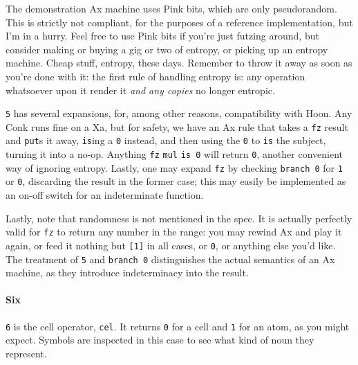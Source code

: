 \documentclass[twoside]{article}
\begin{document}
The demonstration Ax machine uses Pink bits, which are only pseudorandom. This is strictly not compliant, for the purposes of a reference implementation, but I'm in a hurry. Feel free to use Pink bits if you're just futzing around, but consider making or buying a gig or two of entropy, or picking up an entropy machine. Cheap stuff, entropy, these days. Remember to throw it away as soon as you're done with it: the first rule of handling entropy is: any operation whatsoever upon it render it \emph{and any copies} no longer entropic.



\texttt{5} has several expansions, for, among other reasons, compatibility with Hoon. Any Conk runs fine on a Xa, but for safety, we have an Ax rule that takes a \texttt{fz} result and \texttt{put}s it away, \texttt{is}ing a \texttt{0} instead, and then using the \texttt{0} to \texttt{is} the subject, turning it into a no-op. Anything \texttt{fz} \texttt{mul} \texttt{is 0} will return \texttt{0}, another convenient way of ignoring entropy. Lastly, one may expand \texttt{fz} by checking \texttt{branch 0} for \texttt{1} or \texttt{0}, discarding the result in the former case; this may easily be implemented as an on-off switch for an indeterminate function.

Lastly, note that randomness is not mentioned in the spec. It is actually perfectly valid for \texttt{fz} to return any number in the range: you may rewind Ax and play it again, or feed it nothing but \texttt{[1]} in all cases, or \texttt{0}, or anything else you'd like. The treatment of \texttt{5} and \texttt{branch 0} distinguishes the actual semantics of an Ax machine, as they introduce indeterminacy into the result. 


\paragraph{Six}

\texttt{6} is the cell operator, \texttt{cel}. It returns \texttt{0} for a cell and \texttt{1} for an atom, as you might expect. Symbols are inspected in this case to see what kind of noun they represent. 
\end{document}
